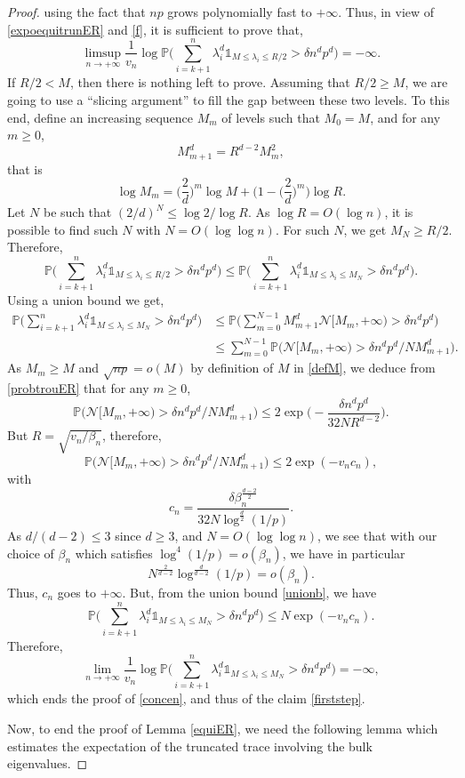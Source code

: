 \documentclass[aop,preprint]{imsart}
\newcommand\PP{\mathbb{P}}
\newcommand\Car{\mathds{1}}
\numberwithin{equation}{section}
\theoremstyle{definition}
\theoremstyle{plain}
\theoremstyle{remark}
\begin{document}
\begin{proof}
using the fact that $np$ grows polynomially fast to $+\infty$.
Thus, in view of \eqref{expoequitrunER} and \eqref{f}, it is sufficient to prove that,
\begin{equation} \label{condsuff} \limsup_{n\to +\infty} \frac{1}{v_n} \log \PP\Big( \sum_{i=k+1}^n \lambda_i^d \Car_{M\leq  \lambda_i \leq  R/2} >\delta n^dp^d\Big) = -\infty.\end{equation}
If $R/2< M$, then there is nothing left to prove. Assuming that $R/2 \geq  M$, we are going to use a ``slicing argument'' to fill the gap between these two levels. To this end, define an increasing sequence $M_m$ of levels such that $M_0 = M$, and for any $m\geq 0$,
$$ M_{m+1}^{d}=R^{d-2} M_m^2,$$
that is
$$\log M_m =   \Big( \frac{2}{d}\Big)^m \log M +\Big(1- \Big( \frac{2}{d}\Big)^{m}\Big) \log R.$$
Let $N$ be such that $ (2/d)^N\leq \log 2/\log R$. As $\log R = O(\log n)$, it is possible to find such $N$ with $N =O(\log \log n)$. For such $N$, we get $ M_N \geq R/2$.
Therefore,
$$\PP\Big( \sum_{i=k+1}^n \lambda_i^d \Car_{M\leq \lambda_i \leq R/2} >\delta n^dp^d\Big) \leq \PP\Big( \sum_{i=k+1}^n \lambda_i^d \Car_{M\leq \lambda_i \leq M_N} >\delta n^dp^d\Big).$$
Using a union bound we get,
\begin{align}
\PP\Big( \sum_{i=k+1}^n \lambda_i^d \Car_{M\leq  \lambda_i \leq  M_N} >\delta n^dp^d\Big) & \leq \PP\Big( \sum_{m=0}^{N-1}M_{m+1}^d\mathcal{N}[M_m,+\infty) >\delta n^dp^d\Big)\nonumber \\
& \leq \sum_{m=0}^{N-1} \PP\big( \mathcal{N}[M_m,+\infty)  >\delta n^dp^d/NM_{m+1}^d\big).\label{unionb}
\end{align}
As $M_m \geq M$ and $\sqrt{np} =o(M)$ by definition of $M$ in \eqref{defM}, we deduce from \eqref{probtrouER} that for any $m \geq 0$,
$$  \PP\Big( \mathcal{N}[M_m,+\infty) >\delta n^dp^d/NM_{m+1}^d\Big) \leq 2\exp\Big( -\frac{\delta n^d p^d}{32 N R^{d-2}}\Big).$$
But $R = \sqrt{v_n/\beta_n}$, therefore,
$$  \PP\Big( \mathcal{N}[M_m,+\infty)  >\delta n^dp^d/NM_{m+1}^d\Big) \leq2 \exp (- v_n c_n),$$
with 
$$c_n  = \frac{\delta \beta_n^{\frac{d-2}{2}}}{32N \log^\frac{d}{2} (1/p)}.$$
As $d/(d-2)\leq 3$ since $d\geq 3$, and $N=O(\log \log n)$, we see that with our choice of $\beta_n$ which satisfies $\log^4 (1/p) = o(\beta_n)$, we have in particular
$$ N^{\frac{2}{d-2}} \log ^{\frac{d}{d-2}}(1/p) = o(\beta_n).$$
Thus, $c_n$ goes to $+\infty$.
But, from the union bound \eqref{unionb}, we have
$$\PP\Big( \sum_{i=k+1}^n \lambda_i^d \Car_{M\leq  \lambda_i \leq M_N} >\delta n^dp^d\Big) \leq N \exp( - v_nc_n).$$
Therefore,
$$\lim_{n\to +\infty} \frac{1}{v_n} \log \PP\Big( \sum_{i=k+1}^n \lambda_i^d \Car_{M\leq  \lambda_i\leq  M_N} >\delta n^dp^d\Big)=-\infty,$$
which ends the proof of \eqref{concen}, and thus of the claim \eqref{firststep}. 


Now, to end the proof of Lemma \ref{equiER}, we need the following lemma which estimates the expectation of the truncated trace involving the bulk eigenvalues.\renewcommand{\qedsymbol}{}
\end{proof}
\end{document}
